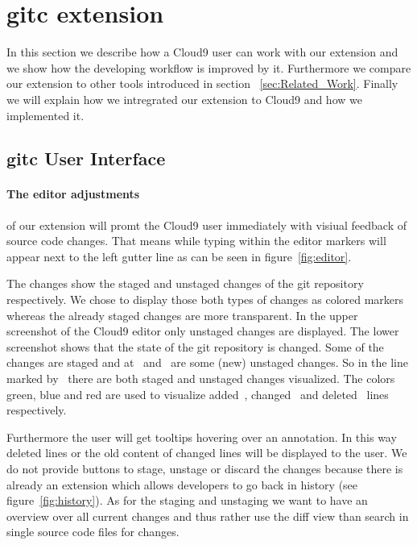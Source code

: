 \section{gitc extension}
\label{sec:Extension}
In this section we describe how a Cloud9 user can work with our extension and we show how the developing workflow is improved by it.
Furthermore we compare our extension to other tools introduced in section ~\ref{sec:Related_Work}.
Finally we will explain how we intregrated our extension to Cloud9 and how we implemented it.

\subsection{gitc User Interface}
\label{sec:gitc_ui}
\paragraph{The editor adjustments} of our extension will promt the Cloud9 user immediately with visiual feedback of source code changes.
That means while typing within the editor markers will appear next to the left gutter line as can be seen in figure~\ref{fig:editor}.

The changes show the staged and unstaged changes of the git repository respectively.
We chose to display those both types of changes as colored markers whereas the already staged changes are more transparent.
In the upper screenshot of the Cloud9 editor only unstaged changes are displayed.
The lower screenshot shows that the state of the git repository is changed.
Some of the changes are staged and at~ and~ are some (new) unstaged changes.
So in the line marked by~ there are both staged and unstaged changes visualized.
The colors green, blue and red are used to visualize added~, changed~ and deleted~ lines respectively.

Furthermore the user will get tooltips hovering over an annotation.
In this way deleted lines or the old content of changed lines will be displayed to the user.
We do not provide buttons to stage, unstage or discard the changes because there is already an extension which allows developers to go back in history (see figure~\ref{fig:history}).
As for the staging and unstaging we want to have an overview over all current changes and thus rather use the diff view than search in single source code files for changes.

